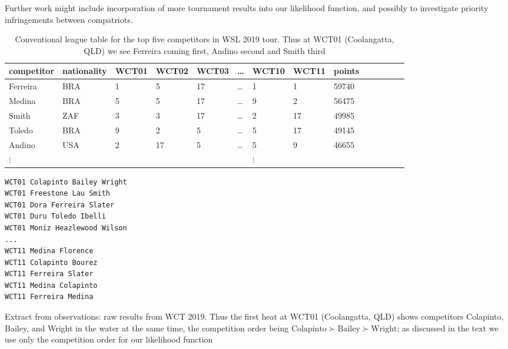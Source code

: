 \documentclass{article}
\begin{document}
Further work might include incorporation of more tournament results
into our likelihood function, and possibly to investigate priority
infringements between compatriots.




\clearpage
\newpage


\begin{table}[h]
\begin{tabular}{llllllllllllll}
competitor  & nationality&WCT01  &WCT02  &WCT03  & \ldots  &WCT10&WCT11&points\\ \hline
 Ferreira   &   BRA      &   1   &   5   &   17  & \ldots  &   1   &   1   &   59740\\
 Medina     &   BRA      &   5   &   5   &   17  & \ldots  &   9   &   2   &   56475\\
 Smith 	    &   ZAF      &   3   &   3   &   17  & \ldots  &   2   &   17  &   49985\\
 Toledo     &   BRA      &   9   &   2   &   5   & \ldots  &   5   &   17  &   49145\\
 Andino     &   USA      &   2   &   17  &   5   & \dots   &   5   &   9   &   46655\\
 $\vdots$   &            &   &   &       &       & $\vdots$&       &       &
\end{tabular}
\caption{Conventional league table for the top five competitors in WSL
  2019 tour. \label{resultstable} Thus at WCT01 (Coolangatta, QLD) we see
  Ferreira coming first, Andino second and Smith third}
\end{table}

\clearpage
\newpage


\begin{table}[h]
\begin{verbatim}
WCT01 Colapinto Bailey Wright
WCT01 Freestone Lau Smith
WCT01 Dora Ferreira Slater
WCT01 Duru Toledo Ibelli
WCT01 Moniz Heazlewood Wilson
...
WCT11 Medina Florence
WCT11 Colapinto Bourez
WCT11 Ferreira Slater
WCT11 Medina Colapinto
WCT11 Ferreira Medina
\end{verbatim}
\caption{Extract from observations: raw results\label{rawresults} from
  WCT 2019.  Thus the first heat at WCT01 (Coolangatta, QLD) shows
  competitors Colapinto, Bailey, and Wright in the water at the same
  time, the competition order being
  $\mbox{Colapinto}\succ\mbox{Bailey}\succ\mbox{Wright}$; as discussed
  in the text we use only the competition order for our likelihood
  function}
\end{table}
\end{document}
